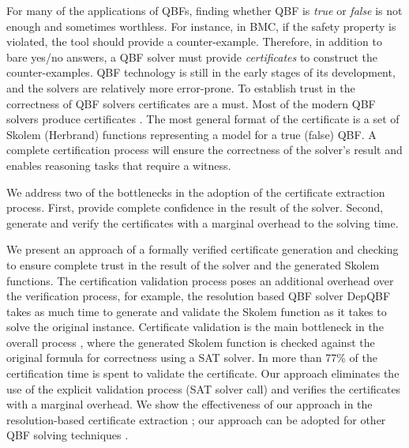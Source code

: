 \documentclass[runningheads]{llncs}
\newcommand{\0}{0}
\newcommand{\1}{1}
\begin{document}
For many of the applications of QBFs, finding whether QBF is \textit{true} or \textit{false} is not enough and sometimes worthless. For instance, in BMC, if the safety property is violated, the tool should provide a counter-example. Therefore, in addition to bare yes/no answers, a QBF solver must provide \textit{certificates} to construct the counter-examples. QBF technology is still in the early stages of its development, and the solvers are relatively more error-prone. To establish trust in the correctness of QBF solvers certificates are a must. Most of the modern QBF solvers produce certificates \cite{Balabanov2015, RabeS16, BalabanovJ12, Benedetti05, NarizzanoPPT09, NiemetzPLSB12, JussilaBSKW07, GoultiaevaGB11, Van2013, HeuleSB17}. The most general format of the certificate is a set of Skolem (Herbrand) functions representing a model for a true (false) QBF. 
A complete certification process will ensure the correctness of the solver's result and enables reasoning tasks that require a witness. 

We address two of the bottlenecks in the adoption of the certificate extraction process. First, provide complete confidence in the result of the solver. Second, generate and verify the certificates with a marginal overhead to the solving time. 

We present an approach of a formally verified certificate generation and checking to ensure complete trust in the result of the solver and the generated Skolem functions. The certification validation process poses an additional overhead over the verification process, for example, the resolution based QBF solver DepQBF \cite{LonsingB10} takes as much time to generate and validate the Skolem function as it takes to solve the original instance. Certificate validation is the main bottleneck in the overall process \cite{NiemetzPLSB12}, where the generated Skolem function is checked against the original formula for correctness using a SAT solver. In \cite{NiemetzPLSB12} more than 77\% of the certification time is spent to validate the certificate. Our approach eliminates the use of the explicit validation process (SAT solver call) and verifies the certificates with a marginal overhead. We show the effectiveness of our approach in the resolution-based certificate extraction \cite{NiemetzPLSB12}; our approach can be adopted for other QBF solving techniques \cite{RabeT15}.
\end{document}
